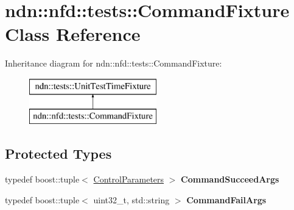 \hypertarget{classndn_1_1nfd_1_1tests_1_1CommandFixture}{}\section{ndn\+:\+:nfd\+:\+:tests\+:\+:Command\+Fixture Class Reference}
\label{classndn_1_1nfd_1_1tests_1_1CommandFixture}
Inheritance diagram for ndn\+:\+:nfd\+:\+:tests\+:\+:Command\+Fixture\+:\begin{figure}[H]
\begin{center}
\leavevmode
\includegraphics[height=2.000000cm]{classndn_1_1nfd_1_1tests_1_1CommandFixture}
\end{center}
\end{figure}
\subsection*{Protected Types}
\begin{DoxyCompactItemize}
\item 
typedef boost\+::tuple$<$ \hyperlink{classndn_1_1nfd_1_1ControlParameters}{Control\+Parameters} $>$ {\bfseries Command\+Succeed\+Args}\hypertarget{classndn_1_1nfd_1_1tests_1_1CommandFixture_a3e719c9fe45ddea1eaa1066c6b202251}{}\label{classndn_1_1nfd_1_1tests_1_1CommandFixture_a3e719c9fe45ddea1eaa1066c6b202251}

\item 
typedef boost\+::tuple$<$ uint32\+\_\+t, std\+::string $>$ {\bfseries Command\+Fail\+Args}\hypertarget{classndn_1_1nfd_1_1tests_1_1CommandFixture_a5979b24b48fb9f519cddfb8f675c2694}{}\label{classndn_1_1nfd_1_1tests_1_1CommandFixture_a5979b24b48fb9f519cddfb8f675c2694}

\end{DoxyCompactItemize}
